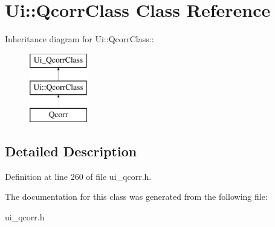 \hypertarget{classUi_1_1QcorrClass}{
\section{Ui::QcorrClass Class Reference}
\label{classUi_1_1QcorrClass}
}
Inheritance diagram for Ui::QcorrClass::\begin{figure}[H]
\begin{center}
\leavevmode
\includegraphics[height=3cm]{classUi_1_1QcorrClass}
\end{center}
\end{figure}


\subsection{Detailed Description}


Definition at line 260 of file ui\_\-qcorr.h.

The documentation for this class was generated from the following file:\begin{DoxyCompactItemize}
\item 
ui\_\-qcorr.h\end{DoxyCompactItemize}
